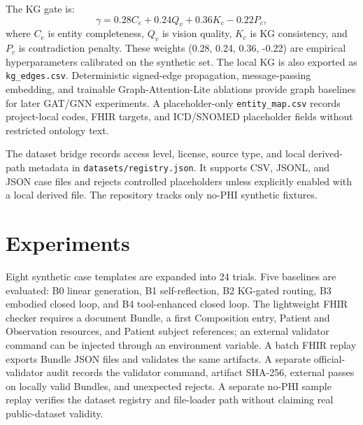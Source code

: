 \documentclass[11pt]{article}
\begin{document}
The KG gate is:
\begin{equation}
\gamma = 0.28 C_e + 0.24 Q_v + 0.36 K_c - 0.22 P_c,
\end{equation}
where $C_e$ is entity completeness, $Q_v$ is vision quality, $K_c$ is KG consistency, and $P_c$ is contradiction penalty. These weights (0.28, 0.24, 0.36, -0.22) are empirical hyperparameters calibrated on the synthetic set.
The local KG is also exported as \texttt{kg\_edges.csv}. Deterministic signed-edge propagation, message-passing embedding, and trainable Graph-Attention-Lite ablations provide graph baselines for later GAT/GNN experiments. A placeholder-only \texttt{entity\_map.csv} records project-local codes, FHIR targets, and ICD/SNOMED placeholder fields without restricted ontology text.

The dataset bridge records access level, license, source type, and local derived-path metadata in \texttt{datasets/registry.json}. It supports CSV, JSONL, and JSON case files and rejects controlled placeholders unless explicitly enabled with a local derived file. The repository tracks only no-PHI synthetic fixtures.

\section{Experiments}
Eight synthetic case templates are expanded into 24 trials. Five baselines are evaluated: B0 linear generation, B1 self-reflection, B2 KG-gated routing, B3 embodied closed loop, and B4 tool-enhanced closed loop. The lightweight FHIR checker requires a document Bundle, a first Composition entry, Patient and Observation resources, and Patient subject references; an external validator command can be injected through an environment variable. A batch FHIR replay exports Bundle JSON files and validates the same artifacts. A separate official-validator audit records the validator command, artifact SHA-256, external passes on locally valid Bundles, and unexpected rejects. A separate no-PHI sample replay verifies the dataset registry and file-loader path without claiming real public-dataset validity.
\end{document}
